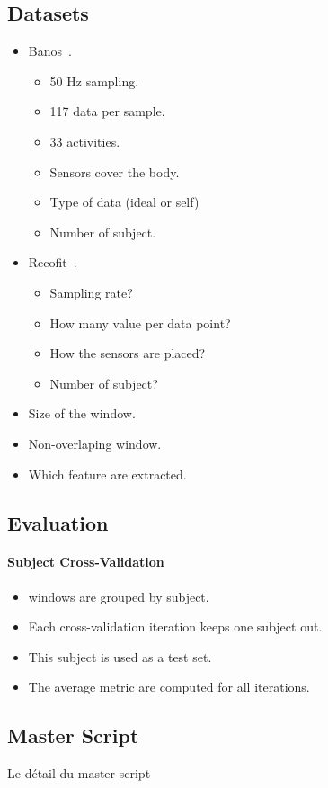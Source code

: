 \subsection{Datasets}
\begin{itemize}
	\item Banos~\cite{Banos_2014}.
	\begin{itemize}
		\item 50 Hz sampling.
		\item 117 data per sample.
		\item 33 activities.
		\item Sensors cover the body.
		\item Type of data (ideal or self)
		\item Number of subject.
	\end{itemize}
	\item Recofit~\cite{recofit}.
	\begin{itemize}
		\item Sampling rate?
		\item How many value per data point?
		\item How the sensors are placed?
		\item Number of subject?
	\end{itemize}
	\item Size of the window.
	\item Non-overlaping window.
	\item Which feature are extracted.
\end{itemize}

\subsection{Evaluation}
\paragraph{Subject Cross-Validation~\cite{subject_cross_validation}}
\begin{itemize}
	\item windows are grouped by subject.
	\item Each cross-validation iteration keeps one subject out.
	\item This subject is used as a test set.
	\item The average metric are computed for all iterations.
\end{itemize}

\subsection{Master Script}
Le détail du master script
